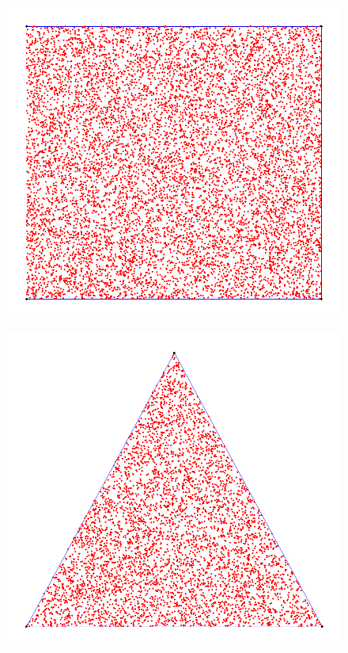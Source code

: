\documentclass[11pt,a4paper]{article}
\begin{document}
        \begin{figure}[!htb]
                \captionsetup{justification=centering,margin=2cm}
            \centering
              \begin{minipage}[b]{0.2\textwidth}
              \centering
                  \includegraphics[width=.8\linewidth]{rectangle}
                  \label{fig:map}
                \end{minipage}
              \begin{minipage}[b]{0.2\textwidth}
              \centering
                  \includegraphics[width=.8\linewidth]{triangle}
                  \label{fig:map}

\end{minipage}
\end{figure}
\end{document}
